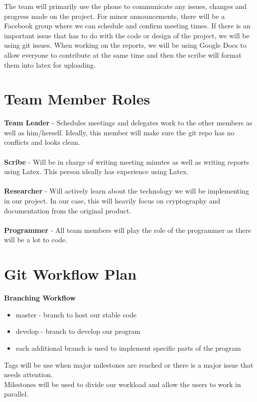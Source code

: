 \documentclass{article}
\begin{document}
The team will primarily use the phone to communicate any issues, changes and progress made on the project. For minor announcements, there will be a Facebook group where we can schedule and confirm meeting times. If there is an important issue that has to do with the code or design of the project, we will be using git issues. When working on the reports, we will be using Google Docs to allow everyone to contribute at the same time and then the scribe will format them into latex for uploading.

\section{Team Member Roles}

\textbf{Team Leader} - Schedules meetings and delegates work to the other members as well as him/herself. Ideally, this member will make sure the git repo has no conflicts and looks clean.\\\\
\textbf{Scribe} - Will be in charge of writing meeting minutes as well as writing reports using Latex. This person ideally has experience using Latex.\\\\
\textbf{Researcher} - Will actively learn about the technology we will be implementing in our project. In our case, this will heavily focus on cryptography and documentation from the original product.\\\\
\textbf{Programmer} - All team members will play the role of the programmer as there will be a lot to code.

\section{Git Workflow Plan}

\textbf{Branching Workflow}
\begin{itemize}
    \item master - branch to host our stable code
    \item develop - branch to develop our program
    \item each additional branch is used to implement specific parts of the program
\end{itemize}
Tags will be use when major milestones are reached or there is a major issue that needs attention.\\
Milestones will be used to divide our workload and allow the users to work in parallel.
\end{document}
